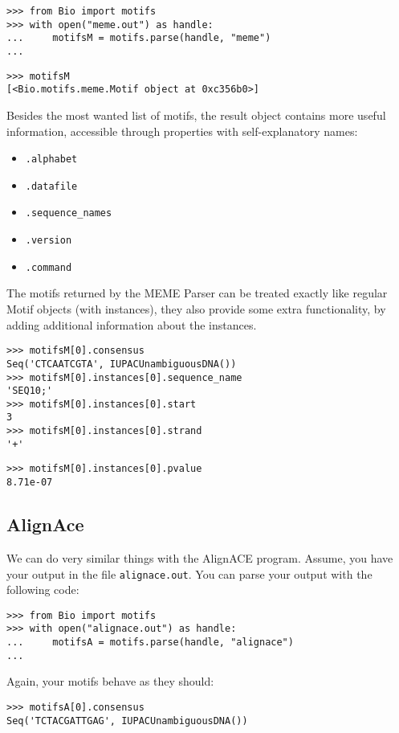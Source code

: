 \documentclass{report}
\begin{document}
\begin{verbatim}
>>> from Bio import motifs
>>> with open("meme.out") as handle:
...     motifsM = motifs.parse(handle, "meme")
...
\end{verbatim}
\begin{verbatim}
>>> motifsM
[<Bio.motifs.meme.Motif object at 0xc356b0>]
\end{verbatim}

Besides the most wanted list of motifs, the result object contains more useful information, accessible through properties with self-explanatory names:
\begin{itemize}
\item \verb|.alphabet|
\item \verb|.datafile|
\item \verb|.sequence_names|
\item \verb|.version|
\item \verb|.command|
\end{itemize}

The motifs returned by the MEME Parser can be treated exactly like regular
Motif objects (with instances), they also provide some extra
functionality, by adding additional information about the instances. 

\begin{verbatim}
>>> motifsM[0].consensus
Seq('CTCAATCGTA', IUPACUnambiguousDNA())
>>> motifsM[0].instances[0].sequence_name
'SEQ10;'
>>> motifsM[0].instances[0].start
3
>>> motifsM[0].instances[0].strand
'+'
\end{verbatim}
\begin{verbatim}
>>> motifsM[0].instances[0].pvalue
8.71e-07
\end{verbatim}


\subsection{AlignAce}
\label{sec:alignace}

We can do very similar things with the AlignACE program. Assume, you have
your output in the file \verb|alignace.out|. You can parse your output
with the following code:

\begin{verbatim}
>>> from Bio import motifs
>>> with open("alignace.out") as handle:
...     motifsA = motifs.parse(handle, "alignace")
...
\end{verbatim}

Again, your motifs behave as they should:
\begin{verbatim}
>>> motifsA[0].consensus
Seq('TCTACGATTGAG', IUPACUnambiguousDNA())
\end{verbatim}
\end{document}
